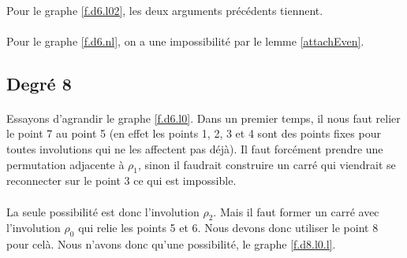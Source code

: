 \documentclass[a4paper]{article}
\theoremstyle{mytheorem}
\begin{document}
\paragraph{}
Pour le graphe \ref{f.d6.l02}, les deux arguments précédents tiennent.

\paragraph{}
Pour le graphe \ref{f.d6.nl}, on a une impossibilité par le lemme \ref{attachEven}.

\subsection{Degré 8}

\paragraph{}
Essayons d'agrandir le graphe \ref{f.d6.l0}. Dans un premier temps, il nous faut relier le point 7 au point 5 (en effet les points 1, 2, 3 et 4 sont des points fixes pour toutes involutions qui ne les affectent pas déjà). Il faut forcément prendre une permutation adjacente à $\rho_1$, sinon il faudrait construire un carré qui viendrait se reconnecter sur le point 3 ce qui est impossible.

\paragraph{}
La seule possibilité est donc l'involution $\rho_2$. Mais il faut former un carré avec l'involution $\rho_0$ qui relie les points 5 et 6. Nous devons donc utiliser le point 8 pour celà. Nous n'avons donc qu'une possibilité, le graphe \ref{f.d8.l0.l}.
\end{document}
